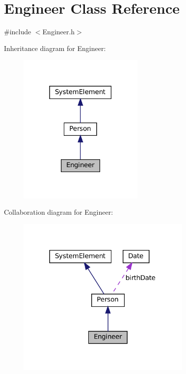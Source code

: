 \hypertarget{classEngineer}{}\section{Engineer Class Reference}
\label{classEngineer}


{\ttfamily \#include $<$Engineer.\+h$>$}



Inheritance diagram for Engineer\+:
\nopagebreak
\begin{figure}[H]
\begin{center}
\leavevmode
\includegraphics[width=174pt]{classEngineer__inherit__graph}
\end{center}
\end{figure}


Collaboration diagram for Engineer\+:
\nopagebreak
\begin{figure}[H]
\begin{center}
\leavevmode
\includegraphics[width=242pt]{classEngineer__coll__graph}
\end{center}
\end{figure}
